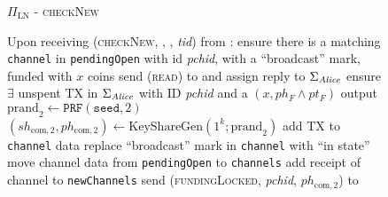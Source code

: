   \begin{figure}[H]
    \begin{protocolbox}{$\Pi_{\mathrm{LN}}$ - \textsc{checkNew}}
      \begin{algorithmic}[1]
        \State Upon receiving (\textsc{checkNew}, \alice, \bob, \textit{tid})
        from \environment: 
        \Indent
          \State ensure there is a matching \texttt{channel} in
          \texttt{pendingOpen} with id \textit{pchid}, with a ``broadcast''
          mark, funded with $x$ coins
          \label{alg:protocol:checkNew:valid}
          \State send (\textsc{read}) to \ledger{} and assign reply to
          $\Sigma_{\mathit{Alice}}$
          \label{alg:protocol:checkNew:read}
          \State ensure $\exists$ unspent TX in $\Sigma_{\mathit{Alice}}$ with ID
          \textit{pchid} and a $\left(x, ph_F \wedge pt_F\right)$ output
          \label{alg:protocol:checkNew:included}
          \State $\mathrm{prand}_2 \gets \texttt{PRF}\left(\mathtt{seed},
          2\right)$
          \label{alg:protocol:checkNew:prand}
          \State $\left(sh_{\mathrm{com}, 2}, ph_{\mathrm{com}, 2}\right) \gets
          \mathrm{KeyShareGen}\left(1^k; \mathrm{prand}_2\right)$
          \State add TX to \texttt{channel} data \State replace ``broadcast''
          mark in \texttt{channel} with ``in state''
            \State move channel data from \texttt{pendingOpen} to
            \texttt{channels}
            \State add receipt of channel to \texttt{newChannels}
          \EndIf
          \State send (\textsc{fundingLocked}, \textit{pchid},
          $ph_{\mathrm{com}, 2}$) to \bob{}
          \label{alg:protocol:checkNew:send}
        \EndIndent
      \end{algorithmic}
    \end{protocolbox}
    \caption{}
    \label{alg:protocol:checkNew}
  \end{figure}

